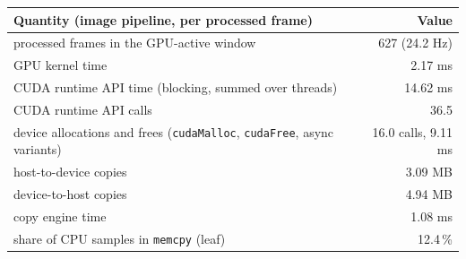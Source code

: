 \begin{tabular}{@{}lr@{}}
\toprule
Quantity (image pipeline, per processed frame) & Value \\
\midrule
processed frames in the GPU-active window & 627 (24.2 Hz) \\
GPU kernel time & 2.17 ms \\
CUDA runtime API time (blocking, summed over threads) & 14.62 ms \\
CUDA runtime API calls & 36.5 \\
device allocations and frees (\texttt{cudaMalloc}, \texttt{cudaFree}, async variants) & 16.0 calls, 9.11 ms \\
host-to-device copies & 3.09 MB \\
device-to-host copies & 4.94 MB \\
copy engine time & 1.08 ms \\
share of CPU samples in \texttt{memcpy} (leaf) & 12.4\,\% \\
\bottomrule
\end{tabular}
